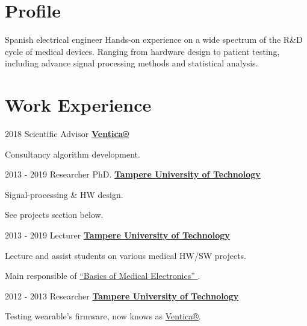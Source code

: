 \documentclass[letterpaper]{twentysecondcv} %
\begin{document}
\begin{RigthPage1}
\section{Profile}  
Spanish electrical engineer     Hands-on experience on a wide spectrum of the R\&D cycle of medical devices. Ranging from hardware design to patient testing, including advance signal processing methods and statistical analysis. 
\\
\section{Work Experience}        
\begin{twenty}
	\twentyitemlist
    	{2018}
        {Scientific Advisor}
        {\href{https://www.ventica.net/}{\textbf{Ventica®}}} 
        {
          \item Consultancy algorithm development.
        }
        
	\twentyitemlist
    	{2013 - 2019}
        {Researcher PhD.}
        {\href{https://www.tut.fi/}{\textbf{Tampere University of Technology}}}
        {
          \item Signal-processing \& HW design.
          \item See projects section below.
        }
        
	\twentyitemlist
    	{2013 - 2019}
        {Lecturer}
        {\href{https://www.tut.fi/}{\textbf{Tampere University of Technology}}}
        {
        \item Lecture and assist students on various medical HW/SW projects.  
        \item Main responsible of 
\href{https://www.youtube.com/watch?time_continue=1&v=E3D8rAG6S4Q}{“Basics of Medical Electronics” }.
        }

	\twentyitemlist
    	{2012 - 2013}
        {Researcher}
        {\href{https://www.tut.fi/}{\textbf{Tampere University of Technology}}}
        {
        \item Testing wearable's firmware, now knows as \href{https://www.ventica.net/}{Ventica®}.   }


\end{twenty}
\end{RigthPage1}
\end{document}
